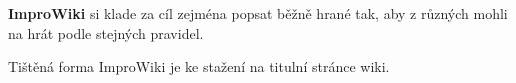 \documentclass[main.tex]{subfiles}
\begin{document}
\needspace{5cm} \label{improwiki} \textbf{ImproWiki}{} si klade za cíl zejména popsat běžně hrané   tak, aby  z různých  mohli na  hrát podle stejných pravidel. 
 
Tištěná forma ImproWiki je ke stažení na titulní stránce wiki. 
\end{document}
